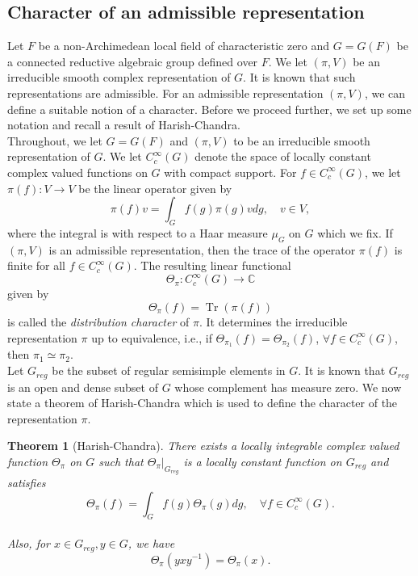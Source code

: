 \documentclass[11pt, a4paper, reqno]{amsart}
\newtheorem{theorem}{Theorem}[section]
\theoremstyle{definition}
\theoremstyle{remark}
\theoremstyle{example}
\theoremstyle{note}
\numberwithin{equation}{section}
\DeclareMathOperator{\tr}{Tr}
\begin{document}
\subsection{Character of an admissible representation}


Let $F$ be a non-Archimedean local field of characteristic zero and $G=G(F)$ be a connected reductive algebraic group defined over $F$. We let $(\pi,V)$ be an irreducible smooth complex representation of $G$. It is known that such representations are admissible. For an admissible representation $(\pi,V)$, we can define a suitable notion of a character. Before we proceed further, we set up some notation and recall a result of Harish-Chandra. \\

Throughout, we let $G=G(F)$ and $(\pi,V)$ to be an irreducible smooth representation of $G$. We let $C^{\infty}_{c}(G)$ denote the space of locally constant complex valued functions on $G$ with compact support. For $f\in C^{\infty}_{c}(G)$, we let $\pi(f): V\rightarrow V$ be the linear operator given by
\[\pi(f)v= \int_{G}f(g)\pi(g)vdg, \quad v\in V,\]
where the integral is with respect to a Haar measure $\mu_{G}$ on $G$ which we fix. If $(\pi,V)$ is an admissible representation, then the trace of the operator $\pi(f)$ is finite for all $f\in C^{\infty}_{c}(G)$. The resulting linear functional
\[\Theta_{\pi}: C^{\infty}_{c}(G)\longrightarrow \mathbb{C}\] given by
\[\Theta_{\pi}(f)=\tr(\pi(f))\]
is called the \textit{distribution character} of $\pi$. It determines the irreducible representation $\pi$ up to equivalence, i.e., 
if $\Theta_{\pi_{1}}(f)=\Theta_{\pi_{2}}(f)$, $\forall f\in C^{\infty}_{c}(G)$, then $\pi_{1}\simeq \pi_{2}$. \\

Let $G_{reg}$ be the subset of regular semisimple elements in $G$. It is known that $G_{reg}$ is an open and dense subset of $G$ whose complement has measure zero. We now state a theorem of Harish-Chandra which is used to define the character of the representation $\pi$.\\ 

\begin{theorem}[Harish-Chandra]\label{regularity theorem} There exists a locally integrable complex valued function $\Theta_{\pi}$ on $G$ such that $\Theta_{\pi}|_{G_{reg}}$ is a locally constant function on $G_{reg}$ and satisfies
\[\Theta_{\pi}(f)
 =\int_{G}f(g)\Theta_{\pi}(g)dg, \quad \forall f\in C^{\infty}_{c}(G).\]
\vspace{0.2 cm}\\
Also, for $x\in G_{reg}, y\in G$, we have $$\Theta_{\pi}(yxy^{-1})=\Theta_{\pi}(x).$$
\end{theorem}
\vspace{0.2 cm}
\end{document}
